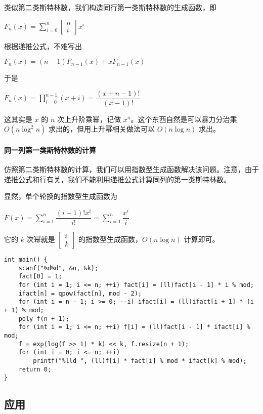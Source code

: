 \documentclass[]{article}
\let\oldparagraph\paragraph
\renewcommand{\paragraph}[1]{\oldparagraph{#1}\mbox{}}
\begin{document}
类似第二类斯特林数，我们构造同行第一类斯特林数的生成函数，即

\(F_n(x)=\sum\limits_{i=0}^n\begin{bmatrix}n\\i\end{bmatrix}x^i\)

根据递推公式，不难写出

\(F_n(x)=(n-1)F_{n-1}(x)+xF_{n-1}(x)\)

于是

\(F_n(x)=\prod\limits_{i=0}^{n-1}(x+i)=\dfrac{(x+n-1)!}{(x-1)!}\)

这其实是 \(x\) 的 \(n\) 次上升阶乘幂，记做
\(x^{\overline n}\)。这个东西自然是可以暴力分治乘 \(O(n\log^2n)\)
求出的，但用上升幂相关做法可以 \(O(n\log n)\) 求出。

\hypertarget{ux540cux4e00ux5217ux7b2cux4e00ux7c7bux65afux7279ux6797ux6570ux7684ux8ba1ux7b97}{%
\paragraph{同一列第一类斯特林数的计算}\label{ux540cux4e00ux5217ux7b2cux4e00ux7c7bux65afux7279ux6797ux6570ux7684ux8ba1ux7b97}}

仿照第二类斯特林数的计算，我们可以用指数型生成函数解决该问题。注意，由于递推公式和行有关，我们不能利用递推公式计算同列的第一类斯特林数。

显然，单个轮换的指数型生成函数为

\(F(x)=\sum\limits_{i=1}^n\dfrac{(i-1)!x^i}{i!}=\sum\limits_{i=1}^n\dfrac{x^i}{i}\)

它的 \(k\) 次幂就是 \(\begin{bmatrix}i\\k\end{bmatrix}\)
的指数型生成函数，\(O(n\log n)\) 计算即可。

\begin{verbatim}
int main() {
    scanf("%d%d", &n, &k);
    fact[0] = 1;
    for (int i = 1; i <= n; ++i) fact[i] = (ll)fact[i - 1] * i % mod;
    ifact[n] = qpow(fact[n], mod - 2);
    for (int i = n - 1; i >= 0; --i) ifact[i] = (ll)ifact[i + 1] * (i + 1) % mod;
    poly f(n + 1);
    for (int i = 1; i <= n; ++i) f[i] = (ll)fact[i - 1] * ifact[i] % mod;
    f = exp(log(f >> 1) * k) << k, f.resize(n + 1);
    for (int i = 0; i <= n; ++i)
        printf("%lld ", (ll)f[i] * fact[i] % mod * ifact[k] % mod);
    return 0;
}
\end{verbatim}

\hypertarget{ux5e94ux7528}{%
\subsection{应用}\label{ux5e94ux7528}}
\end{document}
